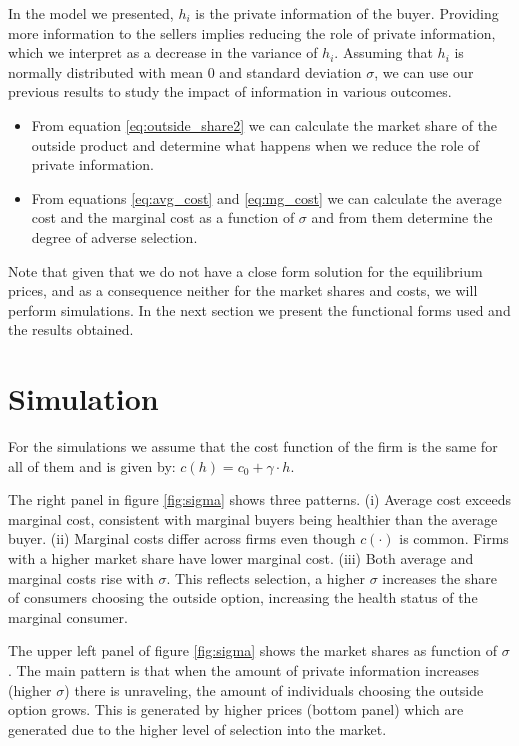 \documentclass[12pt]{article}
\theoremstyle{plain}
\theoremstyle{plain}
\begin{document}
In the model we presented, $h_i$ is the private information of the buyer. Providing more information to the sellers implies reducing the role of private information, which we interpret as a decrease in the variance of $h_i$. Assuming that $h_i$ is normally distributed with mean $0$ and standard deviation $\sigma$, we can use our previous results to study the impact of information in various outcomes.

\begin{itemize}
    \item From equation \ref{eq:outside_share2} we can calculate the market share of the outside product and determine what happens when we reduce the role of private information. 

    \item From equations \ref{eq:avg_cost} and \ref{eq:mg_cost} we can calculate the average cost and the marginal cost as a function of $\sigma$ and from them determine the degree of adverse selection. 

\end{itemize}


Note that given that we do not have a close form solution for the equilibrium prices, and as a consequence neither for the market shares and costs, we will perform simulations. In the next section we present the functional forms used and the results obtained. 




\section{Simulation}\label{sec:simulation}

For the simulations we assume that the cost function of the firm is the same for all of them and is given by: 
$c(h) = c_0 + \gamma \cdot h$. 



The right panel in figure \ref{fig:sigma}   shows three patterns. (i) Average cost exceeds marginal cost, consistent with marginal buyers being healthier than the average buyer. (ii) Marginal costs differ across firms even though  $c(\cdot)$ is common. Firms with a higher market share have lower marginal cost.  (iii) Both average and marginal costs rise with $\sigma$. This reflects selection, a higher $\sigma$ increases the share of consumers choosing the outside option, increasing the health status of the marginal consumer. 


The upper left panel of figure \ref{fig:sigma} shows the market shares as function of $\sigma$. The main pattern is that when the amount of private information increases (higher $\sigma$) there is unraveling, the amount of individuals choosing the outside option grows. This is generated by higher prices (bottom panel) which are generated due to the higher level of selection into the market. 
\end{document}
